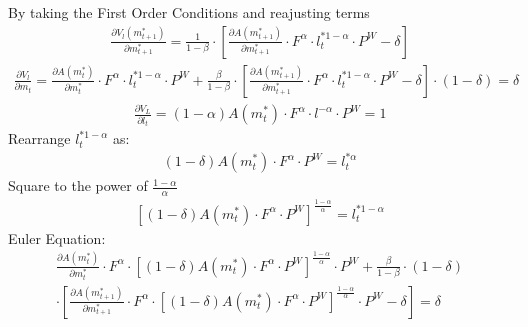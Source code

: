 \documentclass[12pt]{article}
\begin{document}
\normalsize
By taking the First Order Conditions and reajusting terms
\begin{equation}
\begin{aligned}
\frac{\partial V_l(m^\ast_{t+1})}{\partial m^\ast_{t+1}}=\frac{1}{1-\beta}\cdot \left[\frac{\partial A(m^\ast_{t+1})}{\partial m^\ast_{t+1}}\cdot F^\alpha \cdot l^{\ast 1-\alpha}_t \cdot P^W-\delta\right]
\end{aligned}
\end{equation}
\[
\]
\begin{equation}
\begin{aligned}
\frac{\partial V_l}{\partial m_t}=\frac{\partial A(m^\ast_t)}{\partial m^\ast_t} \cdot F^\alpha \cdot l^{\ast 1-\alpha}_t \cdot P^W+\frac{\beta}{1-\beta}\cdot \left[\frac{\partial A(m^\ast_{t+1})}{\partial m^\ast_{t+1}}\cdot F^\alpha \cdot l^{\ast 1-\alpha}_t \cdot P^W-\delta\right]\cdot(1-\delta)=\delta\
\end{aligned}
\end{equation}
\[
\]
\begin{equation}
\begin{aligned}
\frac{\partial V_L}{\partial l_t}= (1-\alpha) A(m^\ast_t) \cdot F^\alpha \cdot l^{-\alpha} \cdot P^W =1
\end{aligned}
\end{equation}
\[
\]
\normalsize
Rearrange $l^{\ast 1-\alpha}_t$ as:
\begin{equation}
\begin{aligned}
(1-\delta)A(m^\ast_t)\cdot F^\alpha \cdot P^W=l^{\ast \alpha}_t
\end{aligned}
\end{equation}
\[
\]
\normalsize
Square to the power of $\frac{1-\alpha}{\alpha}$
\begin{equation}
\begin{aligned}
\left[(1-\delta)A(m^\ast_t)\cdot F^\alpha \cdot P^W\right]^\frac{1-\alpha}{\alpha}= l^{\ast 1-\alpha}_t 
\end{aligned}
\end{equation}
\normalsize
Euler Equation:
\begin{multline}
	\frac{\partial A(m^\ast_t)}{\partial m^\ast_t} \cdot F^\alpha \cdot \left[(1-\delta)A(m^\ast_t)\cdot F^\alpha \cdot P^W\right]^\frac{1-\alpha}{\alpha}\cdot P^W +\frac{\beta}{1-\beta}\cdot (1-\delta) \\
	\cdot\left[\frac{\partial A(m^\ast_{t+1})}{\partial m^\ast_{t+1}}\cdot F^\alpha\cdot \left[(1-\delta)A(m^\ast_t)\cdot F^\alpha\cdot P^W\right]^\frac{1-\alpha}{\alpha}\cdot P^W-\delta\right]=\delta
\end{multline}
\end{document}
